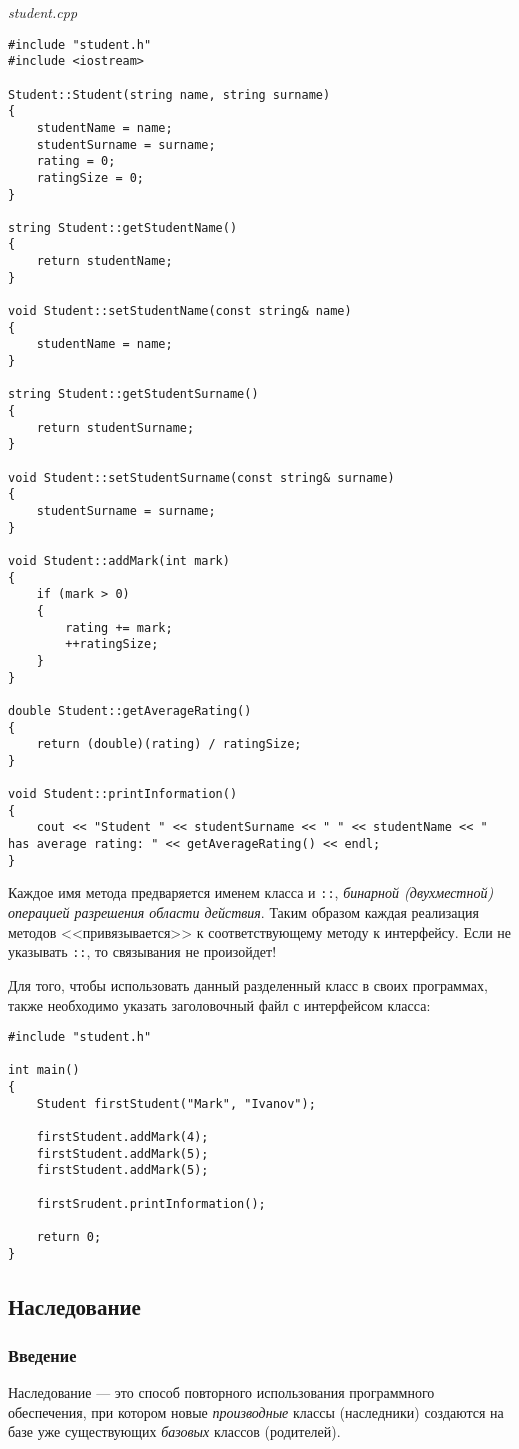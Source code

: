 \emph{student.cpp}
\begin{lstlisting}
#include "student.h"
#include <iostream>

Student::Student(string name, string surname)
{
    studentName = name;
    studentSurname = surname;
    rating = 0;
    ratingSize = 0;
}

string Student::getStudentName()
{
    return studentName;
}

void Student::setStudentName(const string& name)
{
    studentName = name;
}

string Student::getStudentSurname()
{
    return studentSurname;
}

void Student::setStudentSurname(const string& surname)
{
    studentSurname = surname;
}

void Student::addMark(int mark)
{
    if (mark > 0)
    {
        rating += mark;
        ++ratingSize;
    }
}

double Student::getAverageRating()
{
    return (double)(rating) / ratingSize;
}

void Student::printInformation()
{
    cout << "Student " << studentSurname << " " << studentName << " has average rating: " << getAverageRating() << endl;
}
\end{lstlisting}

Каждое имя метода предваряется именем класса и \lstinline|::|, \emph{бинарной (двухместной) операцией разрешения области действия}. Таким образом каждая реализация методов <<привязывается>> к соответствующему методу к интерфейсу. Если не указывать \lstinline|::|, то связывания не произойдет!

Для того, чтобы использовать данный разделенный класс в своих программах, также необходимо указать заголовочный файл с интерфейсом класса:

\begin{lstlisting}
#include "student.h"

int main()
{
    Student firstStudent("Mark", "Ivanov");

    firstStudent.addMark(4);
    firstStudent.addMark(5);
    firstStudent.addMark(5);

    firstSrudent.printInformation();

    return 0;
}
\end{lstlisting}

\subsection{Наследование}
\subsubsection{Введение}
Наследование --- это способ повторного использования программного обеспечения, при котором новые \emph{производные} классы (наследники) создаются на базе уже существующих \emph{базовых} классов (родителей).

